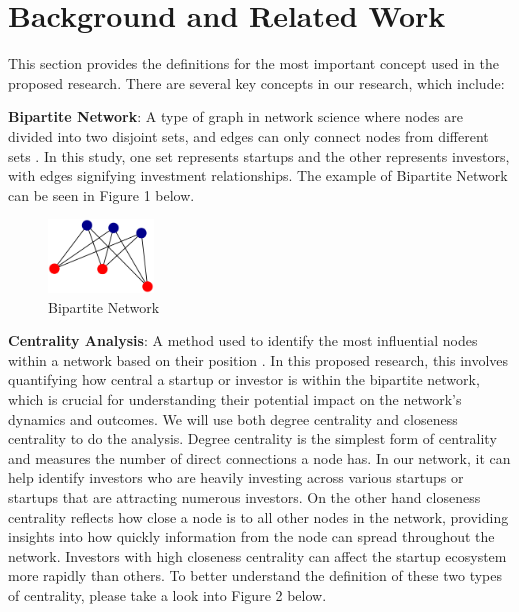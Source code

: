 \documentclass[a4paper,11pt]{article}
\begin{document}
\section{Background and Related Work}

This section provides the definitions for the most important concept used in the proposed research. There are several key concepts in our research, which include:

\textbf{Bipartite Network}: A type of graph in network science where nodes are divided into two disjoint sets, and edges can only connect nodes from different sets \cite{guillaume2005a}. In this study, one set represents startups and the other represents investors, with edges signifying investment relationships. The example of Bipartite Network can be seen in Figure 1 below.

\begin{figure}[h]
\centering
\includegraphics[width=0.25\textwidth]{bipartite.png}
\caption{Bipartite Network}
\end{figure}

\textbf{Centrality Analysis}: A method used to identify the most influential nodes within a network based on their position \cite{albert2019a}. In this proposed research, this involves quantifying how central a startup or investor is within the bipartite network, which is crucial for understanding their potential impact on the network’s dynamics and outcomes. We will use both degree centrality and closeness centrality to do the analysis. Degree centrality is the simplest form of centrality and measures the number of direct connections a node has. In our network, it can help identify investors who are heavily investing across various startups or startups that are attracting numerous investors. On the other hand closeness centrality reflects how close a node is to all other nodes in the network, providing insights into how quickly information from the node can spread throughout the network. Investors with high closeness centrality can affect the startup ecosystem more rapidly than others. To better understand the definition of these two types of centrality, please take a look into Figure 2 below.
\end{document}

